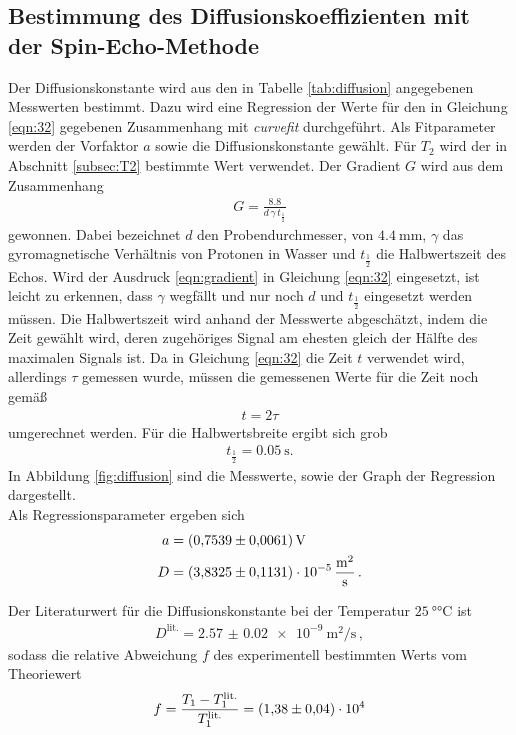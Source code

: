 \subsection{Bestimmung des Diffusionskoeffizienten mit der Spin-Echo-Methode}
\label{subsec:D}
Der Diffusionskonstante wird aus den in Tabelle \ref{tab:diffusion} angegebenen
Messwerten bestimmt.
Dazu wird eine Regression der Werte für den in Gleichung \eqref{eqn:32} gegebenen Zusammenhang mit
\textit{curvefit} durchgeführt.
Als Fitparameter werden der Vorfaktor $a$ sowie die Diffusionskonstante gewählt. Für $T_{2}$ wird der in Abschnitt
\ref{subsec:T2} bestimmte Wert verwendet. Der Gradient $G$ wird aus dem Zusammenhang
\begin{align}
  \label{eqn:gradient}
  G = \frac{8.8}{d \, \gamma \, t_{\frac{1}{2}}}
\end{align}
gewonnen. Dabei bezeichnet $d$ den Probendurchmesser, von $\SI{4.4}{\milli\meter}$, $\gamma$ das gyromagnetische Verhältnis
von Protonen in Wasser und $t_{\frac{1}{2}}$ die Halbwertszeit des Echos.
Wird der Ausdruck \eqref{eqn:gradient} in Gleichung \eqref{eqn:32} eingesetzt, ist leicht zu erkennen, dass $\gamma$ wegfällt und nur noch $d$ und $t_{\frac{1}{2}}$ eingesetzt werden müssen.
Die Halbwertszeit wird anhand der Messwerte abgeschätzt, indem die Zeit gewählt wird, deren zugehöriges Signal am ehesten
gleich der Hälfte des maximalen Signals ist.
Da in Gleichung \eqref{eqn:32} die Zeit $t$ verwendet wird, allerdings $\tau$ gemessen wurde, müssen
die gemessenen Werte für die Zeit noch gemäß
\begin{align}
  t = 2 \tau
\end{align}
umgerechnet werden.
Für die Halbwertsbreite ergibt sich grob
\begin{align*}
  t_{\frac{1}{2}} = \SI{0.05}{\second}.
\end{align*}
In Abbildung \ref{fig:diffusion} sind die Messwerte, sowie der Graph der Regression dargestellt.\\
Als Regressionsparameter ergeben sich
\begin{align*}
  a &= \SI{0.7539+-0.0061}{\volt}\\
  D &= \SI{3.8325+-0.1131 e-5}{\meter\squared\per\second} \, .
\end{align*}

Der Literaturwert \cite{wang1965self} für die Diffusionskonstante bei der Temperatur
$\SI{25}{\degree\celsius}$ ist
\begin{align*}
  D^\text{lit.} = \SI{2.57(2) e-9}{\meter\squared\per\second} \, ,
\end{align*}
sodass die relative Abweichung $f$ des experimentell bestimmten Werts
vom Theoriewert
\begin{align*}
  f = \frac{T_{1} - T_{1}^\text{lit.}}{T_{1}^\text{lit.}} = \SI{1.38+-0.04 e4}{}
\end{align*}


